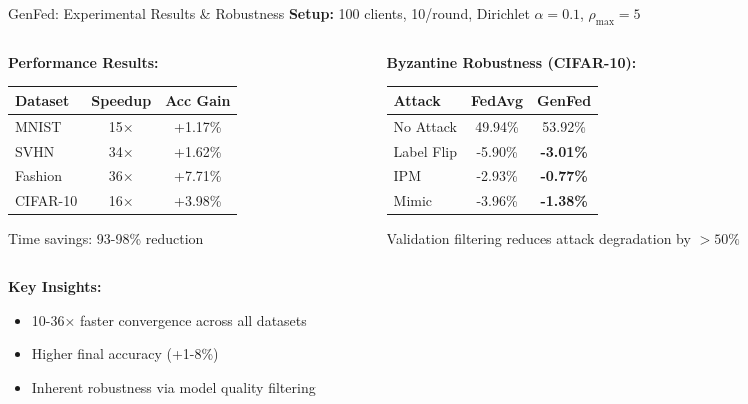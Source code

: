 \documentclass{beamer}
\begin{document}
\begin{frame}{GenFed: Experimental Results \& Robustness}
\scriptsize
\textbf{Setup:} 100 clients, 10/round, Dirichlet $\alpha=0.1$, $\rho_{\max}=5$

\begin{columns}[T]
\begin{column}{0.48\textwidth}
\textbf{Performance Results:}
\begin{table}
\centering
\tiny
\begin{tabular}{|l|c|c|}
\hline
\textbf{Dataset} & \textbf{Speedup} & \textbf{Acc Gain} \\
\hline
MNIST & 15× & +1.17\% \\
SVHN & 34× & +1.62\% \\
Fashion & 36× & +7.71\% \\
CIFAR-10 & 16× & +3.98\% \\
\hline
\end{tabular}
\end{table}
\tiny Time savings: 93-98\% reduction
\end{column}

\begin{column}{0.48\textwidth}
\textbf{Byzantine Robustness (CIFAR-10):}
\begin{table}
\centering
\tiny
\begin{tabular}{|l|c|c|}
\hline
\textbf{Attack} & \textbf{FedAvg} & \textbf{GenFed} \\
\hline
No Attack & 49.94\% & 53.92\% \\
Label Flip & -5.90\% & \textbf{-3.01\%} \\
IPM & -2.93\% & \textbf{-0.77\%} \\
Mimic & -3.96\% & \textbf{-1.38\%} \\
\hline
\end{tabular}
\end{table}
\tiny Validation filtering reduces attack degradation by $>50\%$
\end{column}
\end{columns}

\vspace{0.2cm}
\textbf{Key Insights:}
\begin{itemize}
\item 10-36× faster convergence across all datasets
\item Higher final accuracy (+1-8\%)
\item Inherent robustness via model quality filtering
\end{itemize}
\end{frame}
\end{document}

